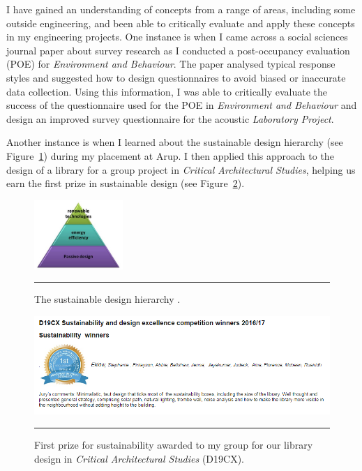 I have gained an understanding of concepts from a range of areas, including some outside engineering, and been able to critically evaluate and apply these concepts in my engineering projects.
One instance 
is when I came across a social sciences journal paper about survey research as I conducted a post-occupancy evaluation (POE) for \textit{Environment and Behaviour}.
The paper analysed typical response styles and suggested how to design questionnaires to avoid biased or inaccurate data collection.
Using this information, I was able to critically evaluate the success of the questionnaire used for the POE in \textit{Environment and Behaviour} and design an improved survey questionnaire for the acoustic \textit{Laboratory Project}.

Another instance 
is when I learned about the sustainable design hierarchy (see Figure~\ref{fig_hierarchy}) during my placement at Arup.
I then applied this approach to the design of a library for a group project in \textit{Critical Architectural Studies}, helping us earn the first prize in sustainable design (see Figure~\ref{fig_award}).


\begin{figure}[htbp]
	\centering
	\includegraphics[width=0.3\textwidth]{figures/Hierarchy.jpg}
	\rule{\textwidth}{0.5pt} %
	\caption[The sustainable design hierarchy.]{The sustainable design hierarchy \citep{Dougherty:online}.}
	\label{fig_hierarchy}
\end{figure}


\begin{figure}[htbp]
	\centering
	\includegraphics[width=\textwidth]{figures/SustainabilityAward.PNG}
	\rule{\textwidth}{0.5pt} %
	\caption[First prize for sustainability awarded to my group for our library design in D19CX.]{First prize for sustainability awarded to my group for our library design in \textit{Critical Architectural Studies} (D19CX).}
	\label{fig_award}
\end{figure}

